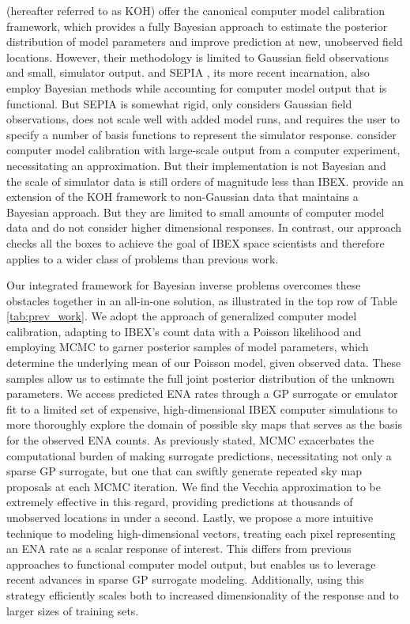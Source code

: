 \documentclass[11pt]{article}
\begin{document}
\citet{kennedyohagan2001} (hereafter referred to as KOH) offer the canonical
computer model calibration framework, which provides a fully Bayesian
approach to estimate the posterior distribution of model parameters and
improve prediction at new, unobserved field locations. However, their
methodology is limited to Gaussian field observations and small, simulator
output. \citet{higdoncalib2008} and SEPIA \citep{gattiker2020lanl}, its more
recent incarnation, also employ Bayesian methods while accounting for
computer model output that is functional. But SEPIA is somewhat rigid, only
considers Gaussian field observations, does not scale well with added model
runs, and requires the user to specify a number of basis functions to
represent the simulator response. \citet{gramacy2015calibrating} consider
computer model calibration with large-scale output from a computer
experiment, necessitating an approximation. But their implementation is not
Bayesian and the scale of simulator data is still orders of magnitude less
than IBEX. \citet{grosskopfcountcalib2020} provide an extension of the KOH
framework to non-Gaussian data that maintains a Bayesian approach. But they
are limited to small amounts of computer model data and do not consider
higher dimensional responses. In contrast, our approach checks all the boxes
to achieve the goal of IBEX space scientists and therefore applies to a
wider class of problems than previous work.

Our integrated framework for Bayesian inverse problems overcomes these
obstacles together in an all-in-one solution, as illustrated in the top row of
Table \ref{tab:prev_work}. We adopt the approach of generalized computer model
calibration, adapting to IBEX's count data with a Poisson likelihood and
employing MCMC to garner posterior samples of model parameters, which
determine the underlying mean of our Poisson model, given observed data. These
samples allow us to estimate the full joint posterior distribution of the
unknown parameters. We access predicted ENA rates through a GP surrogate or
emulator fit to a limited set of expensive, high-dimensional IBEX computer
simulations to more thoroughly explore the domain of possible sky maps that
serves as the basis for the observed ENA counts. As previously stated, MCMC
exacerbates the computational burden of making surrogate predictions,
necessitating not only a sparse GP surrogate, but one that can swiftly
generate repeated sky map proposals at each MCMC iteration. We find the
Vecchia approximation to be extremely effective in this regard, {\color{red}
providing predictions at thousands of unobserved locations in under a
second}. Lastly, we propose a more intuitive technique to modeling
high-dimensional vectors, treating each pixel representing an ENA rate as a
scalar response of interest. This differs from previous approaches to
functional computer model output, but enables us to leverage recent advances
in sparse GP surrogate modeling. Additionally, using this strategy efficiently
scales both to increased dimensionality of the response and to larger sizes of
training sets.
\end{document}
